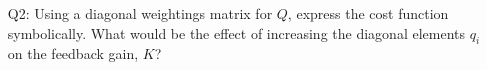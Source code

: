 \documentclass[12pt]{report}
\newcommand\drew[1]{\textcolor{red}{#1}}
\begin{document}
\begin{enumerate}
    \item[Q2:] Using a diagonal weightings matrix for $Q$, express the cost function symbolically. What would be the effect of increasing the diagonal elements $q_i$ on the feedback gain, $K$?\\

\end{enumerate}
\end{document}
